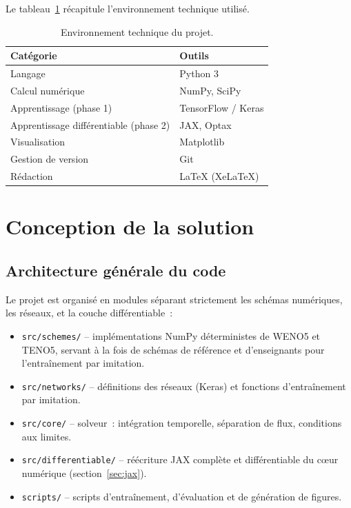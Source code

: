 \documentclass[12pt,a4paper,oneside]{report}
\begin{document}
Le tableau~\ref{tab:techno} récapitule l'environnement technique utilisé.

\begin{table}[H]
\centering
\begin{tabularx}{\textwidth}{@{}lX@{}}
\toprule
\textbf{Catégorie} & \textbf{Outils} \\
\midrule
Langage & Python 3 \\
\rowrule
Calcul numérique & NumPy, SciPy \\
\rowrule
Apprentissage (phase 1) & TensorFlow / Keras \\
\rowrule
Apprentissage différentiable (phase 2) & JAX, Optax \\
\rowrule
Visualisation & Matplotlib \\
\rowrule
Gestion de version & Git \\
\rowrule
Rédaction & \LaTeX{} (XeLaTeX) \\
\bottomrule
\end{tabularx}
\caption{Environnement technique du projet.}
\label{tab:techno}
\end{table}

\chapter{Conception de la solution}
\label{chap:conception}

\section{Architecture générale du code}

Le projet est organisé en modules séparant strictement les schémas numériques,
les réseaux, et la couche différentiable~:

\begin{itemize}
  \item \texttt{src/schemes/} -- implémentations NumPy déterministes de WENO5 et
  TENO5, servant à la fois de schémas de référence et d'enseignants pour
  l'entraînement par imitation.
  \item \texttt{src/networks/} -- définitions des réseaux (Keras) et fonctions
  d'entraînement par imitation.
  \item \texttt{src/core/} -- solveur~: intégration temporelle, séparation de
  flux, conditions aux limites.
  \item \texttt{src/differentiable/} -- réécriture JAX complète et
  différentiable du cœur numérique (section~\ref{sec:jax}).
  \item \texttt{scripts/} -- scripts d'entraînement, d'évaluation et de
  génération de figures.
\end{itemize}
\end{document}
